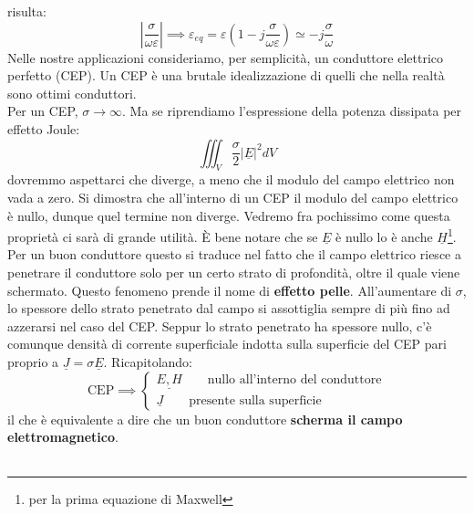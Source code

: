 \documentclass{book}
\begin{document}
        risulta:
        \begin{equation}
            |\frac{\sigma}{\omega \varepsilon}| \implies\varepsilon_{eq} = \varepsilon(1-j \frac{\sigma}{\omega \varepsilon}) \simeq -j \frac{\sigma}{\omega}
        \end{equation}
        Nelle nostre applicazioni consideriamo, per semplicità, un conduttore elettrico perfetto (CEP). Un CEP è una
        brutale idealizzazione di quelli che nella realtà sono ottimi conduttori.  \\ 
        Per un CEP, $\sigma \to \infty$. Ma se riprendiamo l'espressione della potenza dissipata per effetto Joule:
        \begin{equation}
            \iiint_{V} \frac{\sigma}{2}|\underline{E}|^{2}dV
        \end{equation}
        dovremmo aspettarci che diverge, a meno che il modulo del campo elettrico non vada a zero. Si dimostra che all'interno
        di un CEP il modulo del campo elettrico è nullo, dunque quel termine non diverge. Vedremo fra pochissimo come questa proprietà
        ci sarà di grande utilità. È bene notare che se $\underline{E}$ è nullo lo è anche $\underline{H}$\footnote{per la prima equazione di Maxwell}.\\
        Per un buon conduttore questo si traduce nel fatto che il campo elettrico riesce a penetrare il conduttore
        solo per un certo strato di profondità, oltre il quale viene schermato. Questo fenomeno prende il nome di \textbf{effetto pelle}.
        All'aumentare di $\sigma$, lo spessore dello strato penetrato dal campo si assottiglia sempre di più fino ad azzerarsi nel caso del CEP.
        Seppur lo strato penetrato ha spessore nullo, c'è comunque densità di corrente superficiale indotta sulla superficie del CEP pari proprio a 
        $\underline{J}=\sigma \underline{E}$. Ricapitolando:
        \begin{equation}
            \textrm{CEP} \implies 
            \begin{cases}
                \underline{E, H} \qquad \textrm{nullo all'interno del conduttore} \\
                \underline{J} \qquad \textrm{presente sulla superficie}    
            \end{cases}
        \end{equation}
        il che è equivalente a dire che un buon conduttore \textbf{scherma il campo elettromagnetico}.
        \\ \\
\end{document}
